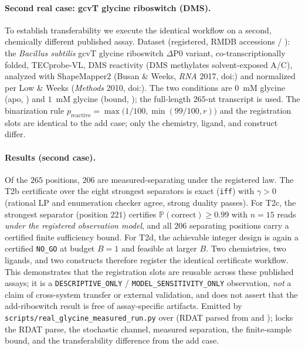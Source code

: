 \documentclass[11pt]{article}
\begin{document}
\paragraph{Second real case: gcvT glycine riboswitch (DMS).}
To establish transferability we execute the identical workflow on a second, chemically different
published assay. Dataset (registered, RMDB accessions
\texttt{} / \texttt{}):
the \emph{Bacillus subtilis} gcvT glycine riboswitch $\Delta$P0 variant, co-transcriptionally folded,
TECprobe-VL, DMS reactivity (DMS methylates solvent-exposed A/C), analyzed with ShapeMapper2
(Busan \& Weeks, \emph{RNA} 2017, doi:\texttt{}) and normalized per
Low \& Weeks (\emph{Methods} 2010, doi:\texttt{}). The two
conditions are $0$~mM glycine (apo,
\texttt{}) and $1$~mM glycine (bound,
\texttt{}); the full-length
$265$-nt transcript is used. The binarization rule
$p_{\mathrm{reactive}}=\max\!\bigl(1/100,\allowbreak \min(99/100,r)\bigr)$
and the registration slots are identical to the add case; only the chemistry, ligand, and construct
differ.

\paragraph{Results (second case).}
Of the $265$ positions, $206$ are measured-separating under the registered law. The T2b certificate over
the eight strongest separators is exact (\texttt{iff}) with $\gamma>0$ (rational LP and enumeration
checker agree, strong duality passes). For T2c, the strongest separator (position $221$) certifies
$\mathbb{P}(\mathrm{correct})\ge0.99$ with $n=15$ reads \emph{under the registered observation model},
and all $206$ separating positions carry a certified finite sufficiency bound. For T2d, the achievable
integer design is again a certified \texttt{NO\_GO} at budget $B=1$ and feasible at larger $B$. Two
chemistries, two ligands, and two constructs therefore register the identical certificate workflow. This
demonstrates that the registration slots are reusable across these published assays; it is a
\texttt{DESCRIPTIVE\_ONLY} / \texttt{MODEL\_SENSITIVITY\_ONLY} observation, \emph{not} a claim of
cross-system transfer or external validation, and does not assert that the add-riboswitch result is free
of assay-specific artifacts. Emitted by
\texttt{scripts/real\_glycine\_measured\_run.py} over
\texttt{}
(RDAT parsed from \texttt{} and
\texttt{});
\texttt{} locks the RDAT parse,
the stochastic channel, measured separation, the finite-sample bound, and the transferability
difference from the add case.
\end{document}
